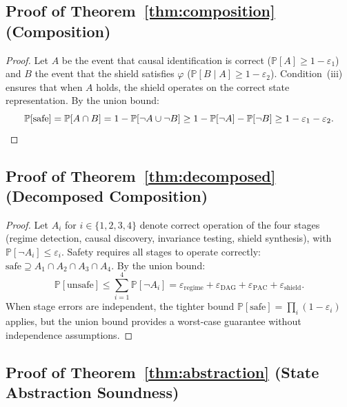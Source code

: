 \documentclass[11pt]{article}
\newcommand{\Prob}{\mathbb{P}}
\begin{document}
\subsection{Proof of Theorem~\ref{thm:composition} (Composition)}

\begin{proof}
Let $A$ be the event that causal identification is correct
($\Prob[A] \geq 1 - \varepsilon_1$) and $B$ the event that the
shield satisfies $\varphi$
($\Prob[B \mid A] \geq 1 - \varepsilon_2$).
Condition~(iii) ensures that when $A$ holds, the shield operates on
the correct state representation.  By the union bound:
\begin{equation}
  \Prob[\text{safe}] = \Prob[A \cap B]
  = 1 - \Prob[\neg A \cup \neg B]
  \geq 1 - \Prob[\neg A] - \Prob[\neg B]
  \geq 1 - \varepsilon_1 - \varepsilon_2. \qedhere
\end{equation}
\end{proof}

\subsection{Proof of Theorem~\ref{thm:decomposed}
  (Decomposed Composition)}

\begin{proof}
Let $A_i$ for $i \in \{1,2,3,4\}$ denote correct operation of the
four stages (regime detection, causal discovery, invariance testing,
shield synthesis), with $\Prob[\neg A_i] \leq \varepsilon_i$.
Safety requires all stages to operate correctly:
$\text{safe} \supseteq A_1 \cap A_2 \cap A_3 \cap A_4$.
By the union bound:
\begin{equation}
  \Prob[\text{unsafe}] \leq \sum_{i=1}^4 \Prob[\neg A_i]
  = \varepsilon_{\mathrm{regime}} + \varepsilon_{\mathrm{DAG}}
  + \varepsilon_{\mathrm{PAC}} + \varepsilon_{\mathrm{shield}}.
\end{equation}
When stage errors are independent, the tighter bound
$\Prob[\text{safe}] = \prod_i (1 - \varepsilon_i)$ applies, but the
union bound provides a worst-case guarantee without independence
assumptions.
\end{proof}

\subsection{Proof of Theorem~\ref{thm:abstraction}
  (State Abstraction Soundness)}
\end{document}
